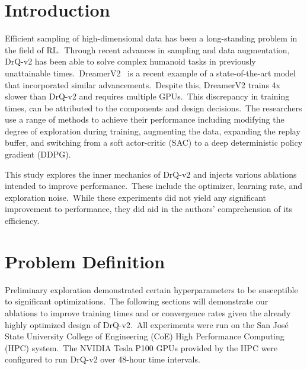 \documentclass[conference]{./IEEEtran/IEEEtran} %
\begin{document}
    \section{Introduction}\label{sec:introduction}
    Efficient sampling of high-dimensional data has been a long-standing problem in the field of RL.\ Through recent advances in
    sampling and data augmentation, DrQ-v2 has been able to solve complex humanoid tasks in previously unattainable times.\
    DreamerV2~\cite{DreamerV2} is a recent example of a state-of-the-art model that incorporated similar advancements.\
    Despite this, DreamerV2 trains 4x slower than DrQ-v2 and requires multiple GPUs.\ This discrepancy in training
    times, can be attributed to the components and design decisions.\ The researchers use a range of methods to achieve their
    performance including modifying the degree of exploration during training, augmenting the data, expanding the
    replay buffer, and switching from a soft actor-critic (SAC) to a deep deterministic policy gradient (DDPG).\


    This study explores the inner mechanics of DrQ-v2 and injects various ablations intended to improve performance.\
    These include the optimizer, learning rate, and exploration noise.\ While these experiments did not yield any significant
    improvement to performance, they did aid in the authors' comprehension of its efficiency.

    \section{Problem Definition}\label{sec:problem-definition}

    Preliminary exploration demonstrated certain hyperparameters to be susceptible to significant optimizations.\ The following
    sections will demonstrate our ablations to improve training times and or convergence rates given the already highly optimized
    design of DrQ-v2.\ All experiments were run on the San Jos\'e State University College of Engineering (CoE) High Performance
    Computing (HPC) system.\ The NVIDIA Tesla P100 GPUs provided by the HPC were configured to run DrQ-v2 over 48-hour time intervals.
\end{document}
